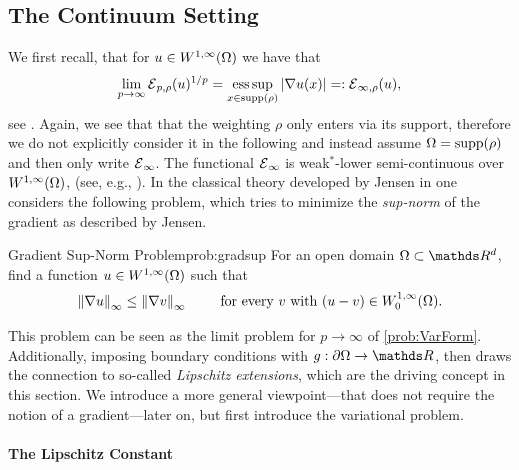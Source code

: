 \subsection{The Continuum Setting}\label{sec:LipExtCont}
%
%
We first recall, that for 
$u\in W^{1,\infty}(\Omega)$ we have that
%
\begin{align*}
\lim_{p\to\infty} \mathcal{E}{}_{p,\rho}(u)^{1/p} = \operatorname*{ess\,sup}_{x\in\mathrm{supp}(\rho)} \left|\nabla u(x)\right| =: \mathcal{E}{}_{\infty,\rho}(u),
\end{align*}
%
see \cite{jensen1993uniqueness}. Again, we see that that the weighting $\rho$ only enters via its support, therefore we do not explicitly consider it in the following and instead assume $\Omega=\mathrm{supp}(\rho)$ and then only write $\mathcal{E}{}_{\infty}$. The functional $\mathcal{E}{}_\infty$ is weak$^*$-lower semi-continuous over $W^{1,\infty}(\Omega)$, (see, e.g., \cite[Thm. 2.6]{barron2001lower}). In the classical theory developed by Jensen in \cite{jensen1993uniqueness} one considers the following problem, which tries to minimize the \emph{sup-norm} of the gradient as described by Jensen.
%
\begin{problem}{Gradient Sup-Norm Problem}{prob:gradsup}
For an open domain $\domain\subset\R^d$, find a function $u\in W^{1,\infty}(\Omega)$ such that
%
\begin{align*}
\left\|\nabla u\right\|_\infty \leq \left\|\nabla v\right\|_\infty \qquad\text{ for every } v \text{ with } (u-v)\in W^{1,\infty}_0(\Omega).
\end{align*}
\end{problem}
%
\noindent%
This problem can be seen as the limit problem for $p\to\infty$ of \cref{prob:VarForm}. Additionally, imposing boundary conditions with $g:\partial\domain\to\R$, \cite{jensen1993uniqueness} then draws the connection to so-called \emph{Lipschitz extensions}, which are the driving concept in this section. We introduce a more general viewpoint---that does not require the notion of a gradient---later on, but first introduce the variational problem. 

\paragraph{The Lipschitz Constant}

